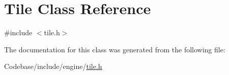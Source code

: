 \hypertarget{class_tile}{\section{Tile Class Reference}
\label{class_tile}
}


{\ttfamily \#include $<$tile.\-h$>$}



The documentation for this class was generated from the following file\-:\begin{DoxyCompactItemize}
\item 
Codebase/include/engine/\hyperlink{_codebase_2include_2engine_2tile_8h}{tile.\-h}\end{DoxyCompactItemize}

